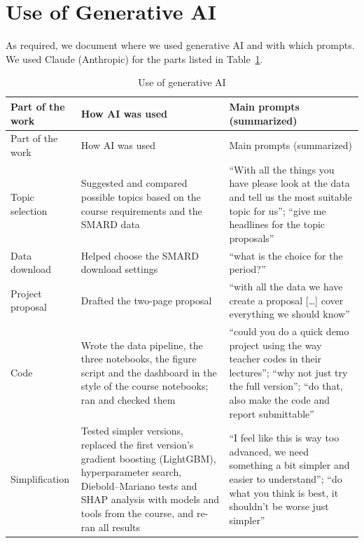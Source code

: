 \documentclass[12pt,oneside]{article}
\begin{document}
\section{Use of Generative AI} \label{sec:genai}

As required, we document where we used generative AI and with which prompts. We used Claude (Anthropic) for the parts listed in Table~\ref{tab:genai}. %

{\small
\begin{longtable}{@{}>{\raggedright\arraybackslash}p{}>{\raggedright\arraybackslash}p{}>{\raggedright\arraybackslash}p{}@{}}
    \caption{Use of generative AI}\label{tab:genai}\\
    \toprule
    Part of the work & How AI was used & Main prompts (summarized) \\
    \midrule
    \endfirsthead
    \toprule
    Part of the work & How AI was used & Main prompts (summarized) \\
    \midrule
    \endhead
    \bottomrule
    \endlastfoot
        Topic selection & Suggested and compared possible topics based on the course requirements and the SMARD data & \enquote{With all the things you have please look at the data and tell us the most suitable topic for us}; \enquote{give me headlines for the topic proposals} \\
        \midrule
        Data download & Helped choose the SMARD download settings & \enquote{what is the choice for the period?} \\
        \midrule
        Project proposal & Drafted the two-page proposal & \enquote{with all the data we have create a proposal [\ldots] cover everything we should know} \\
        \midrule
        Code & Wrote the data pipeline, the three notebooks, the figure script and the dashboard in the style of the course notebooks; ran and checked them & \enquote{could you do a quick demo project using the way teacher codes in their lectures}; \enquote{why not just try the full version}; \enquote{do that, also make the code and report submittable} \\
        \midrule
        Simplification & Tested simpler versions, replaced the first version's gradient boosting (LightGBM), hyperparameter search, Diebold--Mariano tests and SHAP analysis with models and tools from the course, and re-ran all results & \enquote{I feel like this is way too advanced, we need something a bit simpler and easier to understand}; \enquote{do what you think is best, it shouldn't be worse just simpler} \\

\end{longtable}}
\end{document}
